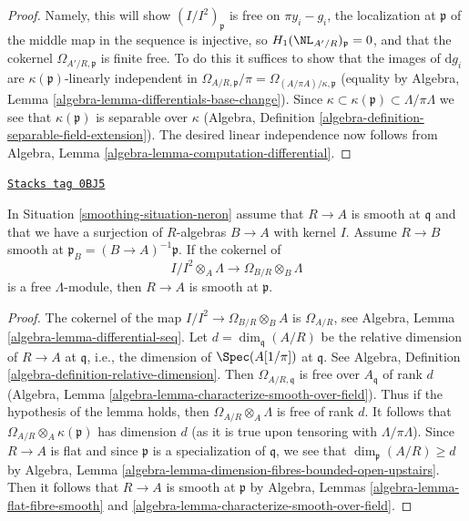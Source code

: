 \begin{proof}
Namely, this will show $(I/I^2)_\mathfrak p$ is free on $\pi y_i - g_i$,
the localization at $\mathfrak p$ of the middle map in the sequence is
injective, so $H_1(\NL_{A'/R})_\mathfrak p = 0$, and
that the cokernel $\Omega_{A'/R, \mathfrak p}$ is finite free.
To do this it suffices to show
that the images of $\text{d}g_i$ are $\kappa(\mathfrak p)$-linearly
independent in
$\Omega_{A/R, \mathfrak p}/\pi = \Omega_{(A/\pi A)/\kappa, \mathfrak p}$
(equality by Algebra, Lemma \ref{algebra-lemma-differentials-base-change}).
Since $\kappa \subset \kappa(\mathfrak p) \subset \Lambda/\pi \Lambda$
we see that $\kappa(\mathfrak p)$ is separable over $\kappa$
(Algebra, Definition \ref{algebra-definition-separable-field-extension}).
The desired linear independence now follows from
Algebra, Lemma \ref{algebra-lemma-computation-differential}.
\end{proof}

\begin{lemma}
\label{smoothing-lemma-neron-when-smooth}
\href{https://stacks.math.columbia.edu/tag/0BJ5}{\texttt{Stacks tag 0BJ5}}

In Situation \ref{smoothing-situation-neron} assume that $R \to A$ is smooth
at $\mathfrak q$ and that we have a surjection of $R$-algebras
$B \to A$ with kernel $I$. Assume $R \to B$ smooth at
$\mathfrak p_B = (B \to A)^{-1}\mathfrak p$. If the cokernel of
$$
I/I^2 \otimes_A \Lambda \to \Omega_{B/R} \otimes_B \Lambda
$$
is a free $\Lambda$-module, then $R \to A$ is smooth at $\mathfrak p$.
\end{lemma}

\begin{proof}
The cokernel of the map $I/I^2 \to \Omega_{B/R} \otimes_B A$
is $\Omega_{A/R}$, see Algebra, Lemma \ref{algebra-lemma-differential-seq}.
Let $d = \dim_\mathfrak q(A/R)$ be the relative dimension of $R \to A$
at $\mathfrak q$, i.e., the dimension of $\Spec(A[1/\pi])$ at $\mathfrak q$.
See Algebra, Definition \ref{algebra-definition-relative-dimension}.
Then $\Omega_{A/R, \mathfrak q}$ is free over $A_\mathfrak q$ of rank $d$
(Algebra, Lemma \ref{algebra-lemma-characterize-smooth-over-field}).
Thus if the hypothesis of the lemma holds,
then $\Omega_{A/R} \otimes_A \Lambda$ is free of rank $d$.
It follows that $\Omega_{A/R} \otimes_A \kappa(\mathfrak p)$
has dimension $d$ (as it is true upon tensoring with $\Lambda/\pi \Lambda$).
Since $R \to A$ is flat and since $\mathfrak p$
is a specialization of $\mathfrak q$, we see that
$\dim_\mathfrak p(A/R) \geq d$ by Algebra, Lemma
\ref{algebra-lemma-dimension-fibres-bounded-open-upstairs}.
Then it follows that $R \to A$ is smooth at $\mathfrak p$ by
Algebra, Lemmas \ref{algebra-lemma-flat-fibre-smooth} and
\ref{algebra-lemma-characterize-smooth-over-field}.
\end{proof}

